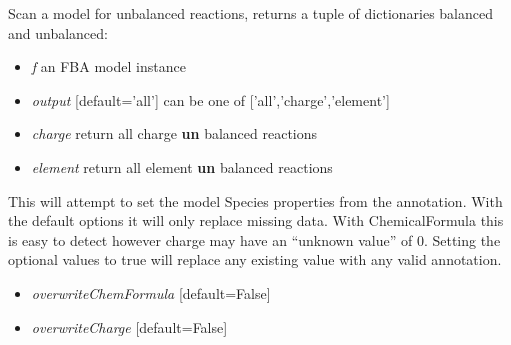 \documentclass[a4paper,11pt,english]{sphinxmanual}
\begin{document}

\begin{fulllineitems}
\label{modules_doc:cbmpy.CBTools.scanForUnbalancedReactions}
Scan a model for unbalanced reactions, returns a tuple of dictionaries balanced and unbalanced:
\begin{itemize}
\item {} 
\emph{f} an FBA model instance

\item {} 
\emph{output} {[}default='all'{]} can be one of {[}'all','charge','element'{]}

\item {} 
\emph{charge} return all charge \textbf{un} balanced reactions

\item {} 
\emph{element} return all element \textbf{un} balanced reactions

\end{itemize}

\end{fulllineitems}


\begin{fulllineitems}
\label{modules_doc:cbmpy.CBTools.setSpeciesPropertiesFromAnnotations}
This will attempt to set the model Species properties from the annotation. With the default options
it will only replace missing data. With ChemicalFormula this is easy to detect however charge may
have an ``unknown value'' of 0. Setting the optional values to true will replace any existing value
with any valid annotation.
\begin{itemize}
\item {} 
\emph{overwriteChemFormula} {[}default=False{]}

\item {} 
\emph{overwriteCharge} {[}default=False{]}

\end{itemize}

\end{fulllineitems}
\end{document}
